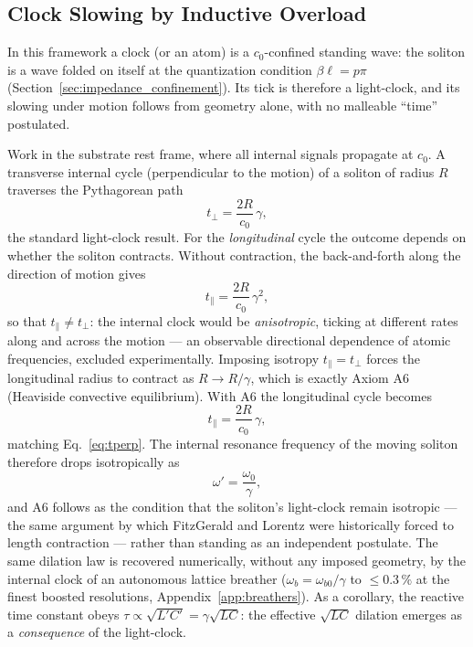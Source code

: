 \documentclass[11pt,a4paper]{article}
\theoremstyle{plain}
\theoremstyle{remark}
\begin{document}
\subsection{Clock Slowing by Inductive Overload}

In this framework a clock (or an atom) is a $c_0$-confined standing wave: the soliton is a wave folded on itself at the quantization condition $\beta\ell = p\pi$ (Section~\ref{sec:impedance_confinement}). Its tick is therefore a light-clock, and its slowing under motion follows from geometry alone, with no malleable ``time'' postulated.

Work in the substrate rest frame, where all internal signals propagate at $c_0$. A transverse internal cycle (perpendicular to the motion) of a soliton of radius $R$ traverses the Pythagorean path
\begin{equation}\label{eq:tperp}
t_\perp = \frac{2R}{c_0}\,\gamma,
\end{equation}
the standard light-clock result. For the \emph{longitudinal} cycle the outcome depends on whether the soliton contracts. Without contraction, the back-and-forth along the direction of motion gives
\begin{equation}\label{eq:tpar_nocontract}
t_\parallel = \frac{2R}{c_0}\,\gamma^2,
\end{equation}
so that $t_\parallel \neq t_\perp$: the internal clock would be \emph{anisotropic}, ticking at different rates along and across the motion --- an observable directional dependence of atomic frequencies, excluded experimentally. Imposing isotropy $t_\parallel = t_\perp$ forces the longitudinal radius to contract as $R \to R/\gamma$, which is exactly Axiom A6 (Heaviside convective equilibrium). With A6 the longitudinal cycle becomes
\begin{equation}\label{eq:tpar_contract}
t_\parallel = \frac{2R}{c_0}\,\gamma,
\end{equation}
matching Eq.~\eqref{eq:tperp}. The internal resonance frequency of the moving soliton therefore drops isotropically as
\begin{equation}
\omega' = \frac{\omega_0}{\gamma},
\end{equation}
and A6 follows as the condition that the soliton's light-clock remain isotropic --- the same argument by which FitzGerald and Lorentz were historically forced to length contraction --- rather than standing as an independent postulate. The same dilation law is recovered numerically, without any imposed geometry, by the internal clock of an autonomous lattice breather ($\omega_b = \omega_{b0}/\gamma$ to $\le 0.3\,\%$ at the finest boosted resolutions, Appendix~\ref{app:breathers}). As a corollary, the reactive time constant obeys $\tau \propto \sqrt{L'C'} = \gamma\sqrt{LC}$: the effective $\sqrt{LC}$ dilation emerges as a \emph{consequence} of the light-clock.
\end{document}
